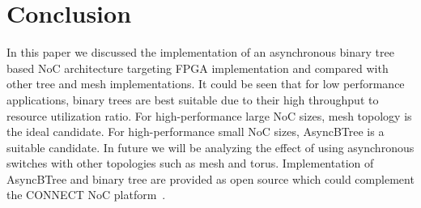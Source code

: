 \section{Conclusion}
\label{sec:conclusion}
In this paper we discussed the implementation of an asynchronous binary tree based NoC architecture targeting FPGA implementation and compared with other tree and mesh implementations.
It could be seen that for low performance applications, binary trees are best suitable due to their high throughput to resource utilization ratio.
For high-performance large NoC sizes, mesh topology is the ideal candidate.
For high-performance small NoC sizes, AsyncBTree is a suitable candidate.
In future we will be analyzing the effect of using asynchronous switches with other topologies such as mesh and torus.
Implementation of AsyncBTree and binary tree are provided as open source which could complement the CONNECT NoC platform~\cite{hnoc}.
